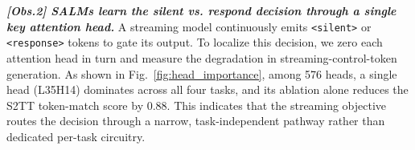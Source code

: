 \documentclass{llmxive}
\begin{document}
\textit{\textbf{[Obs.2] SALMs learn the silent vs. respond decision through a single key attention head.}} A streaming model continuously emits \texttt{<silent>} or \texttt{<response>} tokens to gate its output. To localize this decision, we zero each attention head in turn and measure the degradation in streaming-control-token generation. As shown in Fig.~\ref{fig:head_importance}, among 576 heads, a single head (L35H14) dominates across all four tasks, and its ablation alone reduces the S2TT token-match score by 0.88. This indicates that the streaming objective routes the decision through a narrow, task-independent pathway rather than dedicated per-task circuitry.

\end{document}
